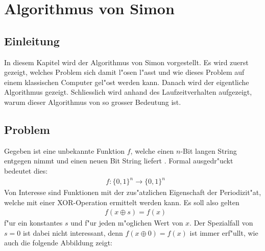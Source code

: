 \chapter{Algorithmus von Simon\label{chapter:simon}} 
\begin{refsection}

\section{Einleitung}
In diesem Kapitel wird der Algorithmus von Simon vorgestellt.  Es wird zuerst
gezeigt, welches Problem sich damit l"osen l"asst und wie dieses Problem auf
einem klassischen Computer gel"ost werden kann. Danach wird der eigentliche
Algorithmus gezeigt. Schliesslich wird anhand des Laufzeitverhalten aufgezeigt,
warum dieser Algorithmus von so grosser Bedeutung ist.
\section{Problem}
Gegeben ist eine unbekannte Funktion $f$, welche einen $n$-Bit langen String
entgegen nimmt und einen neuen Bit String liefert
\cite{simon:cse599d-dave-bacon}. Formal ausgedr"uckt bedeutet dies:
\begin{align*}
  &f\colon\{0,1\}^n\to\{0,1\}^n
\end{align*}
Von Interesse sind Funktionen mit der zus"atzlichen Eigenschaft der
Periodizit"at, welche mit einer XOR-Operation ermittelt werden kann.
Es soll also gelten
\begin{align*}
  &f(x \oplus s) = f(x)
\end{align*}
f"ur ein konstantes $s$ und f"ur jeden m"oglichen Wert von $x$. 
Der Spezialfall von $s = 0$ ist dabei nicht interessant, denn $f(x \oplus 0)
= f(x)$ ist immer erf"ullt, wie auch die folgende Abbildung zeigt:
\begin{figure}[H]
 \centering
\end{figure}
\end{refsection}
